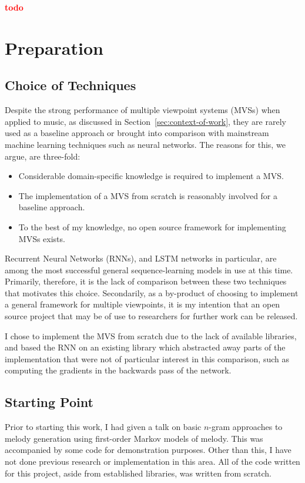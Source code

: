 \documentclass[12pt,a4paper,twoside,openright]{report}
\newcommand{\todo}{\textcolor{red}{\textbf{todo}~}}
\begin{document}
\todo

\chapter{Preparation}

\section{Choice of Techniques}

Despite the strong performance of multiple viewpoint systems (MVSs) when applied
to music, as discussed in Section~\ref{sec:context-of-work}, they are rarely
used as a baseline approach or brought into comparison with mainstream machine
learning techniques such as neural networks. The reasons for this, we argue, are
three-fold:
\begin{itemize}
  \item Considerable domain-specific knowledge is required to implement a MVS.
  \item The implementation of a MVS from scratch is reasonably involved for a
    baseline approach.
  \item To the best of my knowledge, no open source framework for implementing
    MVSs exists.
\end{itemize}

Recurrent Neural Networks (RNNs), and LSTM networks in particular, are among the
most successful general sequence-learning models in use at this time. Primarily,
therefore, it is the lack of comparison between these two techniques that
motivates this choice. Secondarily, as a by-product of choosing to implement a
general framework for multiple viewpoints, it is my intention that an open
source project that may be of use to researchers for further work can be
released.

I chose to implement the MVS from scratch due to the lack of available
libraries, and based the RNN on an existing library which abstracted away parts
of the implementation that were not of particular interest in this comparison,
such as computing the gradients in the backwards pass of the network.

\section{Starting Point}

Prior to starting this work, I had given a talk on basic $n$-gram approaches to
melody generation using first-order Markov models of melody. This was
accompanied by some code for demonstration purposes. Other than this, I have
not done previous research or implementation in this area. All of the code
written for this project, aside from established libraries, was written from
scratch.
\end{document}
